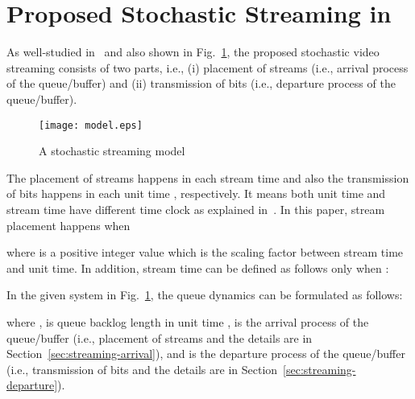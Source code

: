 \documentclass[conference]{IEEEtran}
\begin{document}
\section{Proposed Stochastic Streaming in~\cite{ton2015kim,arxiv2014kim}}\label{sec:2}
As well-studied in~\cite{ton2015kim,arxiv2014kim} and also shown in Fig.~\ref{fig:StochasticStreamingConcept}, the proposed stochastic video streaming consists of two parts, i.e., (i) placement of streams (i.e., arrival process of the queue/buffer) and (ii) transmission of bits (i.e., departure process of the queue/buffer).

\begin{figure}[t!]
	\begin{center}
		\texttt{[image: model.eps]}
	\end{center}
	\caption{A stochastic streaming model}
	\label{fig:StochasticStreamingConcept}
\end{figure}

The placement of streams happens in each stream time  and also the transmission of bits happens in each unit time , respectively. It means both unit time and stream time have different time clock as explained in~\cite{ton2015kim}.
In this paper, stream placement happens when

where  is a positive integer value which is the scaling factor between stream time and unit time.
In addition, stream time can be defined as follows only when :


In the given system in Fig.~\ref{fig:StochasticStreamingConcept}, the queue dynamics can be formulated as follows:

where
    ,
     is queue backlog length in unit time ,
     is the arrival process of the queue/buffer (i.e., placement of streams and the details are in Section~\ref{sec:streaming-arrival}),
    and
     is the departure process of the queue/buffer (i.e., transmission of bits and the details are in Section~\ref{sec:streaming-departure}).
\end{document}
